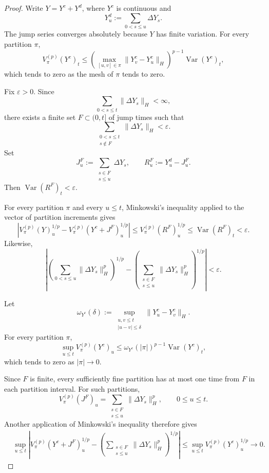 \documentclass[a4paper,10pt]{article}
\begin{document}
\begin{proof}
Write \(Y=Y^c+Y^d\), where \(Y^c\) is continuous and
\[
        Y_u^d
        :=
        \sum_{0<s\le u}\Delta Y_s.
\]
The jump series converges absolutely because \(Y\) has finite
variation. For every partition \(\pi\),
\[
V_\pi^{(p)}(Y^c)_t
\le
\left(
\max_{[u,v]\in\pi}
\lVert Y_v^c-Y_u^c\rVert_H
\right)^{p-1}
\operatorname{Var}(Y^c)_t,
\]
which tends to zero as the mesh of \(\pi\) tends to zero.

Fix \(\varepsilon>0\). Since
\[
        \sum_{0<s\le t}\lVert\Delta Y_s\rVert_H<\infty,
\]
there exists a finite set \(F\subset(0,t]\) of jump times such that
\[
        \sum_{\substack{0<s\le t\\s\notin F}}
        \lVert\Delta Y_s\rVert_H
        <
        \varepsilon.
\]
Set
\[
        J_u^F
        :=
        \sum_{\substack{s\in F\\s\le u}}\Delta Y_s,
        \qquad
        R_u^F
        :=
        Y_u^d-J_u^F.
\]
Then
$
        \operatorname{Var}(R^F)_t<\varepsilon.
$

For every partition \(\pi\) and every \(u\le t\), Minkowski's
inequality applied to the vector of partition increments gives
\[
\left|
V_\pi^{(p)}(Y)_u^{1/p}
-
V_\pi^{(p)}(Y^c+J^F)_u^{1/p}
\right|
\le
V_\pi^{(p)}(R^F)_u^{1/p}
\le
\operatorname{Var}(R^F)_t
<
\varepsilon.
\]
Likewise,
\[
\left|
\left(
\sum_{0<s\le u}\lVert\Delta Y_s\rVert_H^p
\right)^{1/p}
-
\left(
\sum_{\substack{s\in F\\s\le u}}
\lVert\Delta Y_s\rVert_H^p
\right)^{1/p}
\right|
<
\varepsilon.
\]

Let
\[
        \omega_{Y^c}(\delta)
        :=
        \sup_{\substack{u,v\le t\\|u-v|\le\delta}}
        \lVert Y_u^c-Y_v^c\rVert_H.
\]
For every partition \(\pi\),
\[
\sup_{u\le t}V_\pi^{(p)}(Y^c)_u
\le
\omega_{Y^c}(|\pi|)^{p-1}
\operatorname{Var}(Y^c)_t,
\]
which tends to zero as \(|\pi|\to0\).

Since \(F\) is finite, every sufficiently fine partition has at most
one time from \(F\) in each partition interval. For such partitions,
\[
        V_\pi^{(p)}(J^F)_u
        =
        \sum_{\substack{s\in F\\s\le u}}
        \lVert\Delta Y_s\rVert_H^p,
        \qquad 0\le u\le t.
\]
Another application of Minkowski's inequality therefore gives
\[
\begin{aligned}
&\sup_{u\le t}
\left|
V_\pi^{(p)}(Y^c+J^F)_u^{1/p}
-
\left(
\sum_{\substack{s\in F\\s\le u}}
\lVert\Delta Y_s\rVert_H^p
\right)^{1/p}
\right|
\le
\sup_{u\le t}V_\pi^{(p)}(Y^c)_u^{1/p}
\longrightarrow0.
\end{aligned}
\]


\end{proof}
\end{document}
